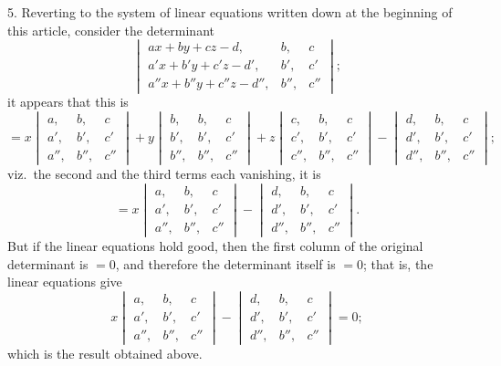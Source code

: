 \documentclass[12pt,a4paper,oneside]{book}
\begin{document}
5. Reverting to the system of linear equations written down at the beginning of this article, consider the determinant
\[
\begin{vmatrix} ax+by+cz-d, & b, & c \\ a'x+b'y+c'z-d', & b', & c' \\ a''x+b''y+c''z-d'', & b'', & c'' \end{vmatrix};
\]
it appears that this is
\[
= x\begin{vmatrix} a, & b, & c \\ a', & b', & c' \\ a'', & b'', & c'' \end{vmatrix} + y\begin{vmatrix} b, & b, & c \\ b', & b', & c' \\ b'', & b'', & c'' \end{vmatrix} + z\begin{vmatrix} c, & b, & c \\ c', & b', & c' \\ c'', & b'', & c'' \end{vmatrix} - \begin{vmatrix} d, & b, & c \\ d', & b', & c' \\ d'', & b'', & c'' \end{vmatrix};
\]
viz.\ the second and the third terms each vanishing, it is
\[
= x\begin{vmatrix} a, & b, & c \\ a', & b', & c' \\ a'', & b'', & c'' \end{vmatrix} - \begin{vmatrix} d, & b, & c \\ d', & b', & c' \\ d'', & b'', & c'' \end{vmatrix}.
\]
But if the linear equations hold good, then the first column of the original determinant is $=0$, and therefore the determinant itself is $=0$; that is, the linear equations give
\[
x\begin{vmatrix} a, & b, & c \\ a', & b', & c' \\ a'', & b'', & c'' \end{vmatrix} - \begin{vmatrix} d, & b, & c \\ d', & b', & c' \\ d'', & b'', & c'' \end{vmatrix} = 0;
\]
which is the result obtained above.
\end{document}
